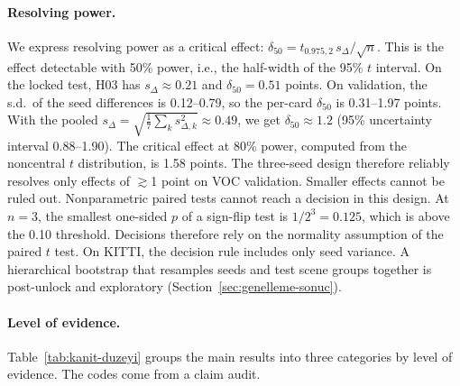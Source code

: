 \documentclass[pdflatex,iicol,sn-mathphys-num]{sn-jnl}
\begin{document}
\paragraph{Resolving power.}
We express resolving power as a critical effect: $\delta_{50}=t_{0.975,2}\,s_\Delta/\sqrt n$. This is the effect detectable with 50\% power, i.e., the half-width of the 95\% $t$ interval. On the locked test, H03 has $s_\Delta\approx0.21$ and $\delta_{50}=0.51$ points. On validation, the s.d.\ of the seed differences is 0.12--0.79, so the per-card $\delta_{50}$ is 0.31--1.97 points. With the pooled $s_\Delta=\sqrt{\tfrac17\sum_k s_{\Delta,k}^2}\approx0.49$, we get $\delta_{50}\approx1.2$ (95\% uncertainty interval 0.88--1.90). The critical effect at 80\% power, computed from the noncentral $t$ distribution, is 1.58 points. The three-seed design therefore reliably resolves only effects of $\gtrsim$1 point on VOC validation. Smaller effects cannot be ruled out. Nonparametric paired tests cannot reach a decision in this design. At $n=3$, the smallest one-sided $p$ of a sign-flip test is $1/2^3=0.125$, which is above the 0.10 threshold. Decisions therefore rely on the normality assumption of the paired $t$ test. On KITTI, the decision rule includes only seed variance. A hierarchical bootstrap that resamples seeds and test scene groups together is post-unlock and exploratory (Section~\ref{sec:genelleme-sonuc}).

\paragraph{Level of evidence.}
Table~\ref{tab:kanit-duzeyi} groups the main results into three categories by level of evidence. The codes come from a claim audit.
\end{document}
